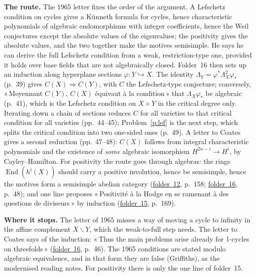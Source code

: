 \documentclass[11pt]{article}
\newcommand{\q}[1]{«\,#1\,»}
\newcommand{\fac}[1]{\href{https://grothendieck.umontpellier.fr/#1.pdf}{folder~#1}}
\theoremstyle{definition}
\theoremstyle{plain}\newtheorem*{proposition}{Proposition}\theoremstyle{definition}
\newcommand{\entry}[1]{\par\medskip\noindent\textbf{#1}\enspace}
\begin{document}
\entry{The route.} The 1965 letter fixes the order of the argument. A Lefschetz condition on cycles gives a Künneth formula for cycles, hence characteristic polynomials of algebraic endomorphisms with integer coefficients, hence the Weil conjectures except the absolute values of the eigenvalues; the positivity gives the absolute values, and the two together make the motives semisimple. He says he can derive the full Lefschetz condition from a weak, restriction-type one, provided it holds over base fields that are not algebraically closed. Folder~16 then sets up an induction along hyperplane sections $\varphi : Y \hookrightarrow X$. The identity $\Lambda_Y = \varphi^*\Lambda_X^2\varphi_*$ (p.~39) gives $C(X) \Rightarrow C(Y)$, with $C$ the Lefschetz-type conjecture; conversely, \q{Moyennant $C(Y)$, $C(X)$ équivaut à la condition} that $\Lambda_X\varphi_*$ be algebraic (p.~41), which is the Lefschetz condition on $X \times Y$ in the critical degree only. Iterating down a chain of sections reduces $C$ for all varieties to that critical condition for all varieties (pp.~44--45); Problem~\ref{p:lef} is the next step, which splits the critical condition into two one-sided ones (p.~49). A letter to Coates gives a second reduction (pp.~47--48): $C(X)$ follows from integral characteristic polynomials and the existence of \emph{some} algebraic isomorphism $H^{2n-i} \to H^i$, by Cayley--Hamilton. For positivity the route goes through algebras: the rings $\operatorname{End}(h^i(X))$ should carry a positive involution, hence be semisimple, hence the motives form a semisimple abelian category (\fac{12}, p.~158; \fac{16}, p.~48); and one line proposes \q{Positivité à la Hodge en se ramenant à des questions de diviseurs} by induction (\fac{15}, p.~169).

\entry{Where it stops.} The letter of 1965 misses a way of moving a cycle to infinity in the affine complement $X \smallsetminus Y$, which the weak-to-full step needs. The letter to Coates says of the induction: \q{Thus the main problems arise already for 1-cycles on threefolds} (\fac{16}, p.~46). The 1965 conditions are stated modulo algebraic equivalence, and in that form they are false (Griffiths), as the modernised reading notes. For positivity there is only the one line of folder~15.
\end{document}
